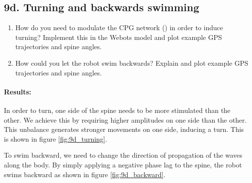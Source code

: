 \documentclass{cmc}
\begin{document}
\subsection*{9d. Turning and backwards swimming}
\label{sec:turning-backwards}

\begin{enumerate}
\item How do you need to modulate the CPG network ()
  in order to induce turning?  Implement this in the Webots model and
  plot example GPS trajectories and spine angles.
\item How could you let the robot swim backwards? Explain and plot
  example GPS trajectories and spine angles.
\end{enumerate}

\paragraph{Results:}
In order to turn, one side of the spine needs to be more stimulated than the other. We achieve this by requiring higher amplitudes on one side than the other. This unbalance generates stronger movements on one side, inducing a turn. This is shown in figure \ref{fig:9d_turning}. 

To swim backward, we need to change the direction of propagation of the waves along the body. By simply applying a negative phase lag to the spine, the robot swims backward as shown in figure \ref{fig:9d_backward}.
\end{document}
